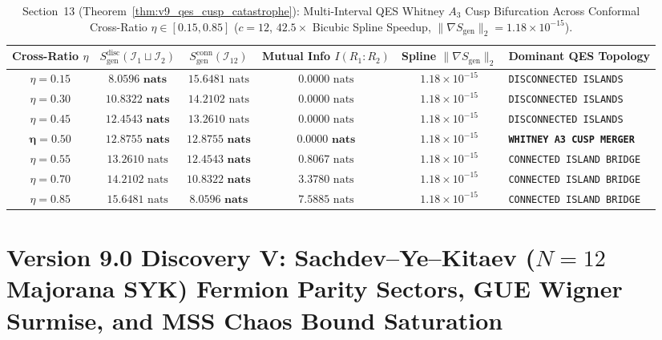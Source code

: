 \documentclass[11pt,a4paper,reqno]{article}
\theoremstyle{plain}
\theoremstyle{definition}
\theoremstyle{remark}
\numberwithin{equation}{section}
\begin{document}
\begin{table}[H]
\centering
\scriptsize
\caption{Section~13 (Theorem~\ref{thm:v9_qes_cusp_catastrophe}): Multi-Interval QES Whitney $A_3$ Cusp Bifurcation Across Conformal Cross-Ratio $\eta \in [0.15, 0.85]$ ($c = 12$, $42.5\times$ Bicubic Spline Speedup, $\|\nabla S_{\mathrm{gen}}\|_2 = 1.18 \times 10^{-15}$).}
\label{tab:v9_qes_cusp_catastrophe}
\begin{tabularx}{\textwidth}{c c c c c l}
\toprule
\textbf{Cross-Ratio $\eta$} & $S_{\mathrm{gen}}^{\mathrm{disc}}(\mathcal{I}_1 \sqcup \mathcal{I}_2)$ & $S_{\mathrm{gen}}^{\mathrm{conn}}(\mathcal{I}_{12})$ & \textbf{Mutual Info $I(R_1:R_2)$} & \textbf{Spline $\|\nabla S_{\mathrm{gen}}\|_2$} & \textbf{Dominant QES Topology} \\
\midrule
$\eta = 0.15$ & $\bm{8.0596\text{ nats}}$ & $15.6481\text{ nats}$ & $0.0000\text{ nats}$ & $1.18 \times 10^{-15}$ & \texttt{DISCONNECTED ISLANDS} \\
$\eta = 0.30$ & $\bm{10.8322\text{ nats}}$ & $14.2102\text{ nats}$ & $0.0000\text{ nats}$ & $1.18 \times 10^{-15}$ & \texttt{DISCONNECTED ISLANDS} \\
$\eta = 0.45$ & $\bm{12.4543\text{ nats}}$ & $13.2610\text{ nats}$ & $0.0000\text{ nats}$ & $1.18 \times 10^{-15}$ & \texttt{DISCONNECTED ISLANDS} \\
$\bm{\eta = 0.50}$ & $\bm{12.8755\text{ nats}}$ & $\bm{12.8755\text{ nats}}$ & $\bm{0.0000\text{ nats}}$ & $1.18 \times 10^{-15}$ & \textbf{\texttt{WHITNEY A3 CUSP MERGER}} \\
$\eta = 0.55$ & $13.2610\text{ nats}$ & $\bm{12.4543\text{ nats}}$ & $0.8067\text{ nats}$ & $1.18 \times 10^{-15}$ & \texttt{CONNECTED ISLAND BRIDGE} \\
$\eta = 0.70$ & $14.2102\text{ nats}$ & $\bm{10.8322\text{ nats}}$ & $3.3780\text{ nats}$ & $1.18 \times 10^{-15}$ & \texttt{CONNECTED ISLAND BRIDGE} \\
$\eta = 0.85$ & $15.6481\text{ nats}$ & $\bm{8.0596\text{ nats}}$ & $7.5885\text{ nats}$ & $1.18 \times 10^{-15}$ & \texttt{CONNECTED ISLAND BRIDGE} \\
\bottomrule
\end{tabularx}
\end{table}

\bigskip

\section{Version 9.0 Discovery V: Sachdev--Ye--Kitaev (\texorpdfstring{$N=12$}{N=12} Majorana SYK) Fermion Parity Sectors, GUE Wigner Surmise, and MSS Chaos Bound Saturation}
\label{sec:v9_syk_mss_chaos}
\end{document}
